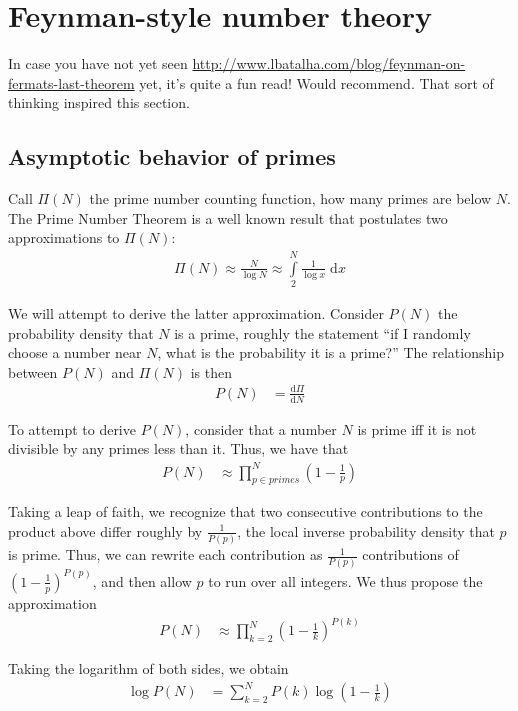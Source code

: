 \documentclass[12pt]{report}
\newcommand*{\rd}[2]{\frac{\mathrm{d}#1}{\mathrm{d}#2}}
\begin{document}
\chapter{Feynman-style number theory}

In case you have not yet seen
\url{http://www.lbatalha.com/blog/feynman-on-fermats-last-theorem} yet, it's
quite a fun read! Would recommend. That sort of thinking inspired this section.

\section{Asymptotic behavior of primes}

Call $\Pi(N)$ the prime number counting function, how many primes are below $N$.
The Prime Number Theorem is a well known result that postulates two
approximations to $\Pi(N)$:
\begin{align}
    \Pi(N) \approx \frac{N}{\log N} \approx \int\limits_{2}^{N}\frac{1}{\log
    x}\;\mathrm{d}x
\end{align}

We will attempt to derive the latter approximation. Consider $P(N)$ the
probability density that $N$ is a prime, roughly the statement ``if I randomly
choose a number near $N$, what is the probability it is a prime?'' The
relationship between $P(N)$ and $\Pi(N)$ is then
\begin{align}
    P(N) &= \rd{\Pi}{N}
\end{align}

To attempt to derive $P(N)$, consider that a number $N$ is prime iff it is not
divisible by any primes less than it. Thus, we have that
\begin{align}
    P(N) &\approx \prod_{p \in primes}^{N}\left( 1 - \frac{1}{p} \right)
\end{align}

Taking a leap of faith, we recognize that two consecutive contributions to the
product above differ roughly by $\frac{1}{P(p)}$, the local inverse probability
density that $p$ is prime. Thus, we can rewrite each contribution as
$\frac{1}{P(p)}$ contributions of $\left( 1 - \frac{1}{p} \right)^{P(p)}$, and
then allow $p$ to run over all integers. We thus propose the approximation
\begin{align}
    P(N) &\approx \prod_{k=2}^N\left( 1 - \frac{1}{k} \right)^{P(k)}
\end{align}

Taking the logarithm of both sides, we obtain
\begin{align}
    \log P(N) &= \sum\limits_{k=2}^{N}P(k)\log\left( 1 - \frac{1}{k} \right)
\end{align}
\end{document}

